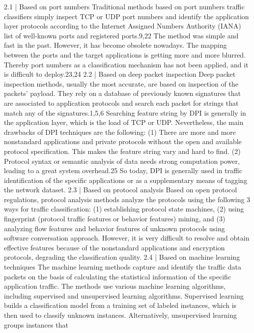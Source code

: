 \documentclass[10pt,journal,compsoc]{IEEEtran}
\begin{document}
2.1 | Based on port numbers
Traditional methods based on port numbers traffic classifiers
simply inspect TCP or UDP port numbers and identify the
application layer protocols according to the Internet Assigned
Numbers Authority (IANA) list of well‐known ports and registered ports.9,22 The method was simple and fast in the past.
However, it has become obsolete nowadays. The mapping
between the ports and the target applications is getting more
and more blurred. Thereby port numbers as a classification
mechanism has not been applied, and it is difficult to
deploy.23,24
2.2 | Based on deep packet inspection
Deep packet inspection methods, usually the most accurate,
are based on inspection of the packets' payload. They rely
on a database of previously known signatures that are associated to application protocols and search each packet for
strings that match any of the signatures.1,5,6 Searching feature
string by DPI is generally in the application layer, which is
the load of TCP or UDP. Nevertheless, the main drawbacks
of DPI techniques are the following: (1) There are more and
more nonstandard applications and private protocols without
the open and available protocol specification. This makes the
feature string vary and hard to find. (2) Protocol syntax or
semantic analysis of data needs strong computation power,
leading to a great system overhead.25 So today, DPI is generally used in traffic identification of the specific applications
or as a supplementary means of tagging the network dataset.
2.3 | Based on protocol analysis
Based on open protocol regulations, protocol analysis
methods analyze the protocols using the following 3 ways
for traffic classification: (1) establishing protocol state
machines, (2) using fingerprint (protocol traffic features or
behavior features) mining, and (3) analyzing flow features
and behavior features of unknown protocols using software
conversation approach.
However, it is very difficult to resolve and obtain effective features because of the nonstandard applications and
encryption protocols, degrading the classification quality.
2.4 | Based on machine learning techniques
The machine learning methods capture and identify the traffic data packets on the basis of calculating the statistical information of the specific application traffic. The methods use
various machine learning algorithms, including supervised
and unsupervised learning algorithms. Supervised learning
builds a classification model from a training set of labeled
instances, which is then used to classify unknown instances.
Alternatively, unsupervised learning groups instances that
\end{document}
